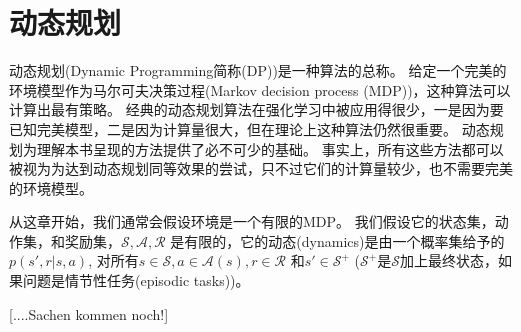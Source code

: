 \chapter{动态规划}

动态规划(Dynamic Programming简称(DP))是一种算法的总称。
给定一个完美的环境模型作为马尔可夫决策过程(Markov decision process (MDP))，这种算法可以计算出最有策略。
经典的动态规划算法在强化学习中被应用得很少，一是因为要已知完美模型，二是因为计算量很大，但在理论上这种算法仍然很重要。
动态规划为理解本书呈现的方法提供了必不可少的基础。
事实上，所有这些方法都可以被视为为达到动态规划同等效果的尝试，只不过它们的计算量较少，也不需要完美的环境模型。

从这章开始，我们通常会假设环境是一个有限的MDP。
我们假设它的状态集，动作集，和奖励集，$\mathcal{S, A, R}$ 是有限的，它的动态(dynamics)是由一个概率集给予的 $p(s', r|s, a)$, 对所有$s \in \mathcal{S}, a \in \mathcal{A}(s), r \in \mathcal{R}$ 和$s' \in \mathcal{S^+}$ ($\mathcal{S^+}$是$\mathcal{S}$加上最终状态，如果问题是情节性任务(episodic tasks))。



[....Sachen kommen noch!]
